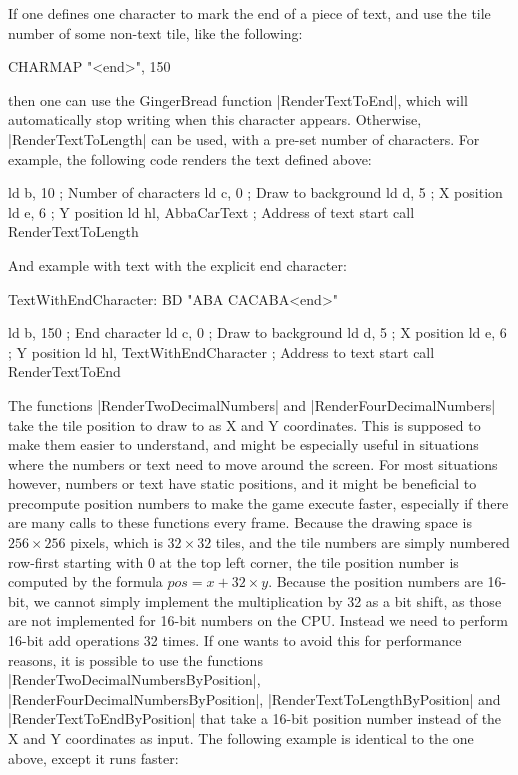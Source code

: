 \documentclass[11pt]{book}
\begin{document}
If one defines one character to mark the end of a piece of text, and use the tile number of some non-text tile, like the following:

\begin{code}
CHARMAP "<end>", 150
\end{code}

then one can use the GingerBread function |RenderTextToEnd|, which will automatically stop writing when this character appears. Otherwise, |RenderTextToLength| can be used, with a pre-set number of characters. For example, the following code renders the text defined above:

\begin{code}
ld b, 10 ; Number of characters
ld c, 0 ; Draw to background
ld d, 5 ; X position 
ld e, 6 ; Y position
ld hl, AbbaCarText ; Address of text start
call RenderTextToLength
\end{code}

And example with text with the explicit end character:

\begin{code}
TextWithEndCharacter:
BD "ABA CACABA<end>"

ld b, 150 ; End character
ld c, 0 ; Draw to background
ld d, 5 ; X position
ld e, 6 ; Y position
ld hl, TextWithEndCharacter ; Address to text start
call RenderTextToEnd
\end{code}

The functions |RenderTwoDecimalNumbers| and |RenderFourDecimalNumbers| take the tile position to draw to as X and Y coordinates. This is supposed to make them easier to understand, and might be especially useful in situations where the numbers or text need to move around the screen. For most situations however, numbers or text have static positions, and it might be beneficial to precompute position numbers to make the game execute faster, especially if there are many calls to these functions every frame. Because the drawing space is $256\times256$ pixels, which is $32\times32$ tiles, and the tile numbers are simply numbered row-first starting with 0 at the top left corner, the tile position number is computed by the formula $pos = x + 32 \times y$. Because the position numbers are 16-bit, we cannot simply implement the multiplication by 32 as a bit shift, as those are not implemented for 16-bit numbers on the CPU. Instead we need to perform 16-bit add operations 32 times. If one wants to avoid this for performance reasons, it is possible to use the functions |RenderTwoDecimalNumbersByPosition|, |RenderFourDecimalNumbersByPosition|, |RenderTextToLengthByPosition| and |RenderTextToEndByPosition| that take a 16-bit position number instead of the X and Y coordinates as input. The following example is identical to the one above, except it runs faster:
\end{document}
